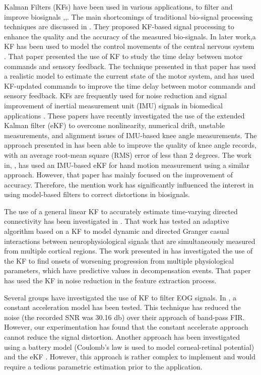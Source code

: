 \documentclass[transmag]{IEEEtran}
\begin{document}
Kalman Filters (KFs) have been used in various applications, to filter and improve biosignals \cite{ref34},\cite{ref35},\cite{ref35}. The main shortcomings of traditional bio-signal processing techniques are discussed in \cite{ref15}. They proposed KF-based signal processing to enhance the quality and the accuracy of the measured bio-signals. In later work,a KF has been used to model the control movements of the central nervous system \cite{ref16}. That paper presented the use of KF to study the time delay between motor commands and sensory feedback. The technique presented in that paper has used a realistic model to estimate the current state of the motor system, and has used KF-updated commands to improve the time delay between motor commands and sensory feedback. KFs are frequently used for noise reduction and signal improvement of inertial measurement unit (IMU) signals in biomedical applications \cite{ref17} \cite{ref18}. These papers have recently investigated the use of the extended Kalman filter (eKF) to overcome nonlinearity, numerical drift, unstable measurements, and alignment issues of IMU-based knee angle measurements. The approach presented in \cite{ref17} has been able to improve the quality of knee angle records, with an average root-mean square (RMS) error of less than 2 degrees.  The work in, \cite{ref18}, has used an IMU-based eKF for hand motion measurement using a similar approach. However, that paper has mainly focused on the improvement of accuracy. Therefore, the mention work has significantly influenced the interest in using model-based filters to correct distortions in biosignals.

The use of a general linear KF to accurately estimate time-varying directed connectivity has been investigated in \cite{ref19}. That work has tested an adaptive algorithm based on a KF to model dynamic and directed Granger casual interactions between neurophysiological signals that are simultaneously measured from multiple cortical regions. The work presented in \cite{ref20} has investigated the use of the KF to find onsets of worsening progression from multiple physiological parameters, which have predictive values in decompensation events. That paper has used the KF in noise reduction in the feature extraction process. 

Several groups have investigated the use of KF to filter EOG signals. In \cite{ref7}, a constant acceleration model has been tested. This technique has reduced the noise (the recorded SNR was 30.16 \si{\decibel}) over their approach of band-pass FIR. However, our experimentation has found that the constant accelerate approach cannot reduce the signal distortion.  Another approach has been investigated using a battery model (Coulomb's law is used to model corneal-retinal potential) and the eKF \cite{ref26}. However, this approach is rather complex to implement and would require a tedious parametric estimation prior to the application. 
\end{document}

